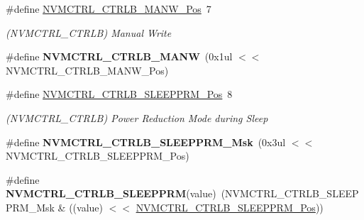 \begin{DoxyCompactItemize}
\item 
\hypertarget{group___s_a_m_l21___n_v_m_c_t_r_l_gaf17fac4102804e50810c49ec470be5e2}{}\#define \hyperlink{group___s_a_m_l21___n_v_m_c_t_r_l_gaf17fac4102804e50810c49ec470be5e2}{N\+V\+M\+C\+T\+R\+L\+\_\+\+C\+T\+R\+L\+B\+\_\+\+M\+A\+N\+W\+\_\+\+Pos}~7\label{group___s_a_m_l21___n_v_m_c_t_r_l_gaf17fac4102804e50810c49ec470be5e2}

\begin{DoxyCompactList}\small\item\em (N\+V\+M\+C\+T\+R\+L\+\_\+\+C\+T\+R\+L\+B) Manual Write \end{DoxyCompactList}\item 
\hypertarget{group___s_a_m_l21___n_v_m_c_t_r_l_gab926dd3f8e1a5dd7bd6ab82e32e97f00}{}\#define {\bfseries N\+V\+M\+C\+T\+R\+L\+\_\+\+C\+T\+R\+L\+B\+\_\+\+M\+A\+N\+W}~(0x1ul $<$$<$ N\+V\+M\+C\+T\+R\+L\+\_\+\+C\+T\+R\+L\+B\+\_\+\+M\+A\+N\+W\+\_\+\+Pos)\label{group___s_a_m_l21___n_v_m_c_t_r_l_gab926dd3f8e1a5dd7bd6ab82e32e97f00}

\item 
\hypertarget{group___s_a_m_l21___n_v_m_c_t_r_l_gac7d2e32d78d79b7a7b67e1f6aa1571df}{}\#define \hyperlink{group___s_a_m_l21___n_v_m_c_t_r_l_gac7d2e32d78d79b7a7b67e1f6aa1571df}{N\+V\+M\+C\+T\+R\+L\+\_\+\+C\+T\+R\+L\+B\+\_\+\+S\+L\+E\+E\+P\+P\+R\+M\+\_\+\+Pos}~8\label{group___s_a_m_l21___n_v_m_c_t_r_l_gac7d2e32d78d79b7a7b67e1f6aa1571df}

\begin{DoxyCompactList}\small\item\em (N\+V\+M\+C\+T\+R\+L\+\_\+\+C\+T\+R\+L\+B) Power Reduction Mode during Sleep \end{DoxyCompactList}\item 
\hypertarget{group___s_a_m_l21___n_v_m_c_t_r_l_gae19435c78d5011e7bb34cb879c66bc8b}{}\#define {\bfseries N\+V\+M\+C\+T\+R\+L\+\_\+\+C\+T\+R\+L\+B\+\_\+\+S\+L\+E\+E\+P\+P\+R\+M\+\_\+\+Msk}~(0x3ul $<$$<$ N\+V\+M\+C\+T\+R\+L\+\_\+\+C\+T\+R\+L\+B\+\_\+\+S\+L\+E\+E\+P\+P\+R\+M\+\_\+\+Pos)\label{group___s_a_m_l21___n_v_m_c_t_r_l_gae19435c78d5011e7bb34cb879c66bc8b}

\item 
\hypertarget{group___s_a_m_l21___n_v_m_c_t_r_l_ga3fbdffb0fca7ae059f4c803d8547a0d5}{}\#define {\bfseries N\+V\+M\+C\+T\+R\+L\+\_\+\+C\+T\+R\+L\+B\+\_\+\+S\+L\+E\+E\+P\+P\+R\+M}(value)~(N\+V\+M\+C\+T\+R\+L\+\_\+\+C\+T\+R\+L\+B\+\_\+\+S\+L\+E\+E\+P\+P\+R\+M\+\_\+\+Msk \& ((value) $<$$<$ \hyperlink{group___s_a_m_l21___n_v_m_c_t_r_l_gac7d2e32d78d79b7a7b67e1f6aa1571df}{N\+V\+M\+C\+T\+R\+L\+\_\+\+C\+T\+R\+L\+B\+\_\+\+S\+L\+E\+E\+P\+P\+R\+M\+\_\+\+Pos}))\label{group___s_a_m_l21___n_v_m_c_t_r_l_ga3fbdffb0fca7ae059f4c803d8547a0d5}


\end{DoxyCompactItemize}
